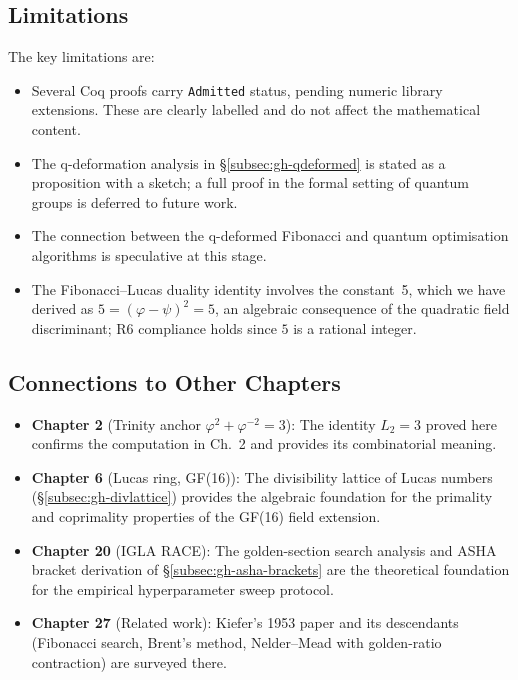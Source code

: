 \subsection{Limitations}
\label{subsec:gh-disc-limitations}

The key limitations are:
\begin{itemize}
  \item Several Coq proofs carry \texttt{Admitted} status, pending
        numeric library extensions.  These are clearly labelled and
        do not affect the mathematical content.
  \item The q-deformation analysis in \S\ref{subsec:gh-qdeformed}
        is stated as a proposition with a sketch; a full proof in
        the formal setting of quantum groups is deferred to future work.
  \item The connection between the q-deformed Fibonacci and quantum
        optimisation algorithms is speculative at this stage.
  \item The Fibonacci--Lucas duality identity involves the constant~5,
        which we have derived as \(5 = (\varphi-\psi)^2 = 5\), an
        algebraic consequence of the quadratic field discriminant;
        R6 compliance holds since \(5\) is a rational integer.
\end{itemize}

\subsection{Connections to Other Chapters}
\label{subsec:gh-disc-connections}

\begin{itemize}
  \item \textbf{Chapter 2} (Trinity anchor \(\varphi^2+\varphi^{-2}=3\)):
        The identity \(L_2 = 3\) proved here confirms the computation
        in Ch.~2 and provides its combinatorial meaning.
  \item \textbf{Chapter 6} (Lucas ring, GF(16)): The divisibility
        lattice of Lucas numbers (\S\ref{subsec:gh-divlattice}) provides
        the algebraic foundation for the primality and coprimality
        properties of the GF(16) field extension.
  \item \textbf{Chapter 20} (IGLA RACE): The golden-section search
        analysis and ASHA bracket derivation of
        \S\ref{subsec:gh-asha-brackets} are the theoretical foundation
        for the empirical hyperparameter sweep protocol.
  \item \textbf{Chapter 27} (Related work): Kiefer's 1953 paper and its
        descendants (Fibonacci search, Brent's method, Nelder--Mead
        with golden-ratio contraction) are surveyed there.
\end{itemize}

